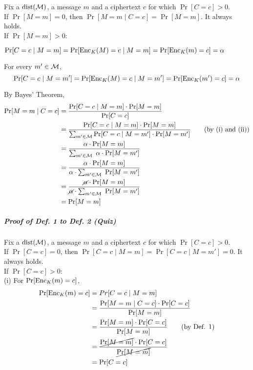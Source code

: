 Fix a \(\operatorname{dist}(\operatorname{\mathcal{M}})\), a message \(m\) and a ciphertext \(c\) for which \(\Pr[C = c] > 0\). \\
If \(\Pr[M = m] = 0\), then \(\Pr[M = m \mid C = c] = \Pr[M = m]\). It always holds. \\
If \(\Pr[M = m] > 0\):
\begin{myEnumerate}[label=(\roman*)]
	\item \( \Pr[C = c \mid M = m] = \Pr[\operatorname{Enc}_K(M) = c \mid M = m] = \Pr[\operatorname{Enc}_K(m) = c] = \mathbf{\alpha} \)
	
	\item For every \(m' \in \operatorname{\mathcal{M}}\),
	\[ \Pr[C = c \mid M = m'] = \Pr[\operatorname{Enc}_K(M) = c \mid M = m'] = \Pr[\operatorname{Enc}_K(m') = c] = \mathbf{\alpha} \]
	
	\item By Bayes' Theorem, 
	\begingroup
	\addtolength{\jot}{1em}
	\begin{align*}
		\Pr[M = m \mid C = c]
				&= \frac{\Pr[C = c \mid M = m] \cdot \Pr[M = m]}{\Pr[C = c]} \\
				&= \frac{\Pr[C = c \mid M = m] \cdot \Pr[M = m]}{\sum_{m' \in \operatorname{\mathcal{M}}} \Pr[C = c \mid M = m'] \cdot \Pr[M = m']} \tag{by (i) and (ii)}\\
				& = \frac{\alpha \cdot \Pr[M = m]}{\sum_{m' \in \operatorname{\mathcal{M}}} \ \alpha \cdot \Pr[M = m']} \\
				& = \frac{\alpha \cdot \Pr[M = m]}{\alpha \cdot \sum_{m' \in \operatorname{\mathcal{M}}} \ \Pr[M = m']} \\
				& = \frac{\cancel\alpha \cdot \Pr[M = m]}{\cancel\alpha \cdot \sum_{m' \in \operatorname{\mathcal{M}}} \ \Pr[M = m']} \\
				& = \Pr[M = m]
	\end{align*}
	\endgroup
\end{myEnumerate}

\pagebreak

\subparagraph{Proof of Def. 1 to Def. 2 (Quiz)}

Fix a \(\operatorname{dist}(\operatorname{\mathcal{M}})\), a message \(m\) and a ciphertext \(c\) for which \(\Pr[C = c] > 0\). \\
If \(\Pr[C = c] = 0\), then \(\Pr[C = c \mid M = m] = \Pr[C = c \mid M = m'] = 0\). It always holds. \\
If \(\Pr[C = c] > 0\): \\
(i) For \(\Pr[\operatorname{Enc}_K(m) = c]\),
\begin{align*}
	\Pr[\operatorname{Enc}_K(m) = c] &= Pr[C = c \mid M = m]\\
	&= \frac{\Pr[M = m \mid C = c] \cdot \Pr[C = c]}{\Pr[M = m]} \\
	&= \frac{\Pr[M = m] \cdot \Pr[C =c]}{\Pr[M = m]} \tag{by Def. 1}\\
	&= \frac{\cancel{\Pr[M = m]} \cdot \Pr[C = c]}{\cancel{\Pr[M = m]}} \\
	&= \Pr[C = c]
\end{align*}

